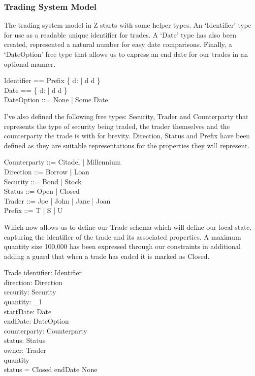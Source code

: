 \documentclass{article}
\begin{document}
\subsubsection*{Trading System Model}

The trading system model in Z starts with some helper types. An ‘Identifier’ type for use as a readable unique identifier for trades. A ‘Date’ type has also been created, represented a natural number for easy date comparisons.  Finally, a ‘DateOption’ free type that allows us to express an end date for our trades in an optional manner.

\begin{zed}
Identifier == Prefix \cross \{ d: \nat | d  \land d  \} \\ 
Date == \{ d: \nat | d  \land d  \} \\
DateOption ::= None | Some \ldata Date \rdata \\
\end{zed}

\hspace{-0.62cm} I've also defined the following free types: Security, Trader and Counterparty that represents the type of security being traded, the trader themselves and the counterparty the trade is with for brevity.  Direction, Status and Prefix have been defined as they are suitable representations for the properties they will represent.

\begin{zed}
Counterparty ::= Citadel | Millennium  \\ 
Direction ::= Borrow | Loan \\
Security ::= Bond | Stock \\
Status ::= Open | Closed \\  
Trader ::= Joe | John | Jane | Joan \\
Prefix ::= T | S | U \\
\end{zed}

\hspace{-0.62cm} Which now allows us to define our Trade schema which will define our local state, capturing the identifier of the trade and its associated properties. A maximum quantity size 100,000 has been expressed through our constraints in additional adding a guard that when a trade has ended it is marked as Closed. 

\begin{schema}{Trade}
identifier: Identifier \\
direction: Direction \\ 
security: Security \\
quantity: \nat_1 \\
startDate: Date \\
endDate: DateOption \\ 
counterparty: Counterparty \\
status: Status \\
owner: Trader \\
\where
quantity  \\
status = Closed \iff endDate \neq None \\
\end{schema}
\end{document}
